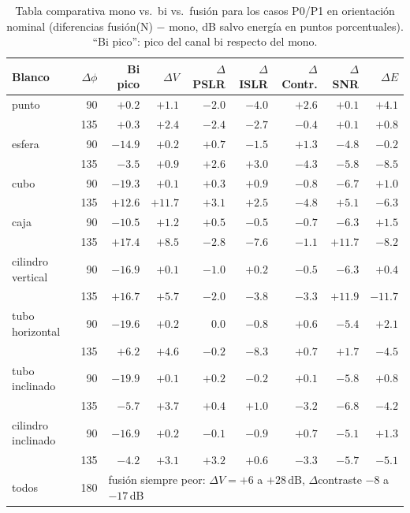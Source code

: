 \begin{table}[H]
\centering\small
\caption{Tabla comparativa mono vs.\ bi vs.\ fusión para los casos P0/P1 en
orientación nominal (diferencias fusión(N) $-$ mono, dB salvo energía en puntos
porcentuales). ``Bi pico'': pico del canal bi respecto del mono.}
\label{tab:P0}
\begin{tabular}{@{}lr|r|rrrrrr@{}}
\toprule
Blanco & $\Delta\phi$ & Bi pico & $\Delta V$ & $\Delta$PSLR & $\Delta$ISLR & $\Delta$Contr. & $\Delta$SNR & $\Delta E$ \\
\midrule
punto & 90 & $+0.2$ & $+1.1$ & $\mathbf{-2.0}$ & $\mathbf{-4.0}$ & $\mathbf{+2.6}$ & $+0.1$ & $+4.1$ \\
 & 135 & $+0.3$ & $+2.4$ & $-2.4$ & $-2.7$ & $-0.4$ & $+0.1$ & $+0.8$ \\
esfera & 90 & $-14.9$ & $+0.2$ & $+0.7$ & $-1.5$ & $+1.3$ & $-4.8$ & $-0.2$ \\
 & 135 & $-3.5$ & $+0.9$ & $+2.6$ & $+3.0$ & $-4.3$ & $-5.8$ & $-8.5$ \\
cubo & 90 & $-19.3$ & $+0.1$ & $+0.3$ & $+0.9$ & $-0.8$ & $-6.7$ & $+1.0$ \\
 & 135 & $+12.6$ & $+11.7$ & $+3.1$ & $+2.5$ & $-4.8$ & $+5.1$ & $-6.3$ \\
caja & 90 & $-10.5$ & $+1.2$ & $+0.5$ & $-0.5$ & $-0.7$ & $-6.3$ & $+1.5$ \\
 & 135 & $+17.4$ & $+8.5$ & $-2.8$ & $-7.6$ & $-1.1$ & $+11.7$ & $-8.2$ \\
cilindro vertical & 90 & $-16.9$ & $+0.1$ & $-1.0$ & $+0.2$ & $-0.5$ & $-6.3$ & $+0.4$ \\
 & 135 & $+16.7$ & $+5.7$ & $-2.0$ & $-3.8$ & $-3.3$ & $+11.9$ & $-11.7$ \\
tubo horizontal & 90 & $-19.6$ & $+0.2$ & $0.0$ & $-0.8$ & $+0.6$ & $-5.4$ & $+2.1$ \\
 & 135 & $+6.2$ & $+4.6$ & $-0.2$ & $-8.3$ & $+0.7$ & $+1.7$ & $-4.5$ \\
tubo inclinado & 90 & $-19.9$ & $+0.1$ & $+0.2$ & $-0.2$ & $+0.1$ & $-5.8$ & $+0.8$ \\
 & 135 & $-5.7$ & $+3.7$ & $+0.4$ & $+1.0$ & $-3.2$ & $-6.8$ & $-4.2$ \\
cilindro inclinado & 90 & $-16.9$ & $+0.2$ & $-0.1$ & $-0.9$ & $+0.7$ & $-5.1$ & $+1.3$ \\
 & 135 & $-4.2$ & $+3.1$ & $+3.2$ & $+0.6$ & $-3.3$ & $-5.7$ & $-5.1$ \\
\midrule
todos & 180 & \multicolumn{7}{l}{fusión siempre peor: $\Delta V=+6$ a $+28$\,dB, $\Delta$contraste $-8$ a $-17$\,dB} \\
\bottomrule
\end{tabular}
\end{table}

